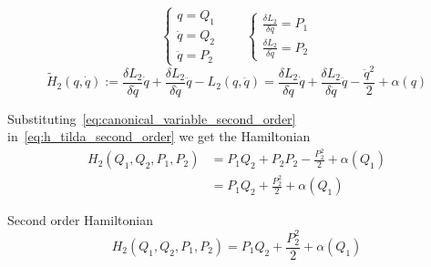 \documentclass[10pt]{beamer}
\begin{document}
  \begin{frame}
    \begin{equation}\label{eq:canonical_variable_second_order}
      \begin{cases}
        q        = Q_1 \\
        \dot{q}  = Q_2 \\
        \ddot{q} = P_2
      \end{cases}
      \qquad
      \begin{cases}
        \frac{\delta L_2}{\delta \dot{q}}  = P_1 \\
        \frac{\delta L_2}{\delta \ddot{q}} = P_2
      \end{cases}
    \end{equation}
    \begin{equation}\label{eq:h_tilda_second_order}
      \tilde{H}_2(q, \dot{q}) :=
        \frac{\delta L_2}{\delta \dot{q}} \dot{q} +
        \frac{\delta L_2}{\delta \ddot{q}} \ddot{q} -
        L_2(q, \ddot{q})
        = \frac{\delta L_2}{\delta \dot{q}} \dot{q} +
        \frac{\delta L_2}{\delta \ddot{q}} \ddot{q} -
        \frac{\ddot{q}^2}{2} + \alpha(q)
    \end{equation}

    Substituting~\eqref{eq:canonical_variable_second_order}
    in~\eqref{eq:h_tilda_second_order} we get the Hamiltonian
    \begin{align*} \label{eq: second-order_motion_eq_ham}
      H_2(Q_1, Q_2, P_1, P_2)
        &= P_1 Q_2 + P_2 P_2 - \frac{P_2^2}{2} + \alpha(Q_1) \\
        &= P_1 Q_2 + \frac{P_2^2}{2} + \alpha(Q_1)
    \end{align*}

    \begin{block}{Second order Hamiltonian}
      \begin{equation*} \label{eq: second-order_motion_eq_ham}
        H_2(Q_1, Q_2, P_1, P_2) = P_1Q_2 + \frac{P_2^2}{2} + \alpha(Q_1)
      \end{equation*}
    \end{block}
  \end{frame}
\end{document}

